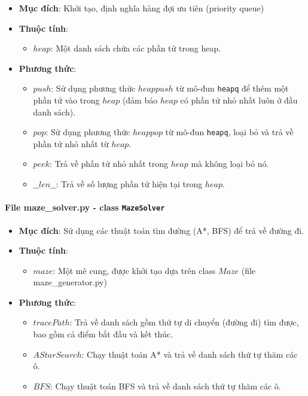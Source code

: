 \begin{itemize}
    \item \textbf{Mục đích}: Khởi tạo, định nghĩa hàng đợi ưu tiên (priority queue)
    
    \item \textbf{Thuộc tính}:
        \begin{itemize}
            \item $heap$: Một danh sách chứa các phần tử trong heap.
        \end{itemize}
        
    \item \textbf{Phương thức}:
        \begin{itemize}
            \item $push$: Sử dụng phương thức $heappush$ từ mô-đun \texttt{heapq} để thêm một phần tử vào trong $heap$ (đảm bảo $heap$ có phần tử nhỏ nhất luôn ở đầu danh sách).
            \item $pop$: Sử dụng phương thức $heappop$ từ mô-đun \texttt{heapq}, loại bỏ và trả về phần tử nhỏ nhất từ $heap$.
            \item $peek$: Trả về phần tử nhỏ nhất trong $heap$ mà không loại bỏ nó.
            \item $\_\_len\_\_$: Trả về số lượng phần tử hiện tại trong $heap$.
        \end{itemize}
\end{itemize}

\paragraph{File maze\_solver.py - class \texttt{MazeSolver}}

\begin{itemize}
    \item \textbf{Mục đích}: Sử dụng các thuật toán tìm đường (A*, BFS) để trả về đường đi.
    
    \item \textbf{Thuộc tính}:
        \begin{itemize}
            \item $maze$: Một mê cung, được khởi tạo dựa trên class $Maze$ (file maze\_generator.py)
        \end{itemize}
        
    \item \textbf{Phương thức}:
        \begin{itemize}
            \item $tracePath$: Trả về danh sách gồm thứ tự di chuyển (đường đi) tìm được, bao gồm cả điểm bắt đầu và kết thúc.
            \item $AStarSearch$: Chạy thuật toán A* và trả về danh sách thứ tự thăm các ô.
            \item $BFS$: Chạy thuật toán BFS và trả về danh sách thứ tự thăm các ô.
        \end{itemize}
\end{itemize}


